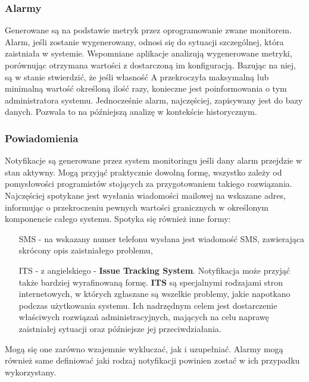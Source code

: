         \subsubsection{Alarmy}
        Generowane są na podstawie metryk przez oprogramowanie zwane monitorem. Alarm, jeśli zostanie wygenerowany, 
        odnosi się do sytuacji szczególnej, która zaistniała w systemie. Wspomniane aplikacje analizują wygenerowane metryki, 
        porównując otrzymana wartości z dostarczoną im konfiguracją. Bazując na niej, są w stanie stwierdzić, że jeśli
        własność A przekroczyła maksymalną lub minimalną wartość określoną ilość razy, konieczne jest poinformowania o tym
        administratora systemu. Jednocześnie alarm, najczęściej, zapisywany jest do bazy danych. Pozwala to na późniejszą analizę 
        w kontekście historycznym. 
        
        \subsubsection{Powiadomienia}
        Notyfikacje są generowane przez system monitoringu jeśli dany alarm przejdzie w stan aktywny. Mogą przyjąć praktycznie
        dowolną formę, wszystko zależy od pomysłowości programistów stojących za przygotowaniem takiego rozwiązania.
        Najczęściej spotykane jest wysłania wiadomości mailowej na wskazane adres, informując o 
        przekroczeniu pewnych wartości granicznych w określonym komponencie całego systemu. Spotyka się również inne formy:
        \begin{itemize}
            \item[SMS] - na wskazany numer telefonu wysłana jest wiadomość SMS, zawierająca skrócony opis zaistniałego problemu,
            \item[ITS] - z angielskiego - \textbf{Issue Tracking System}. Notyfikacja może przyjąć także bardziej wyrafinowaną formę.
            \textbf{ITS} są specjalnymi rodzajami stron internetowych, w których zgłaszane są wszelkie problemy, jakie napotkano
            podczas użytkowania systemu. Ich nadrzędnym celem jest dostarczenie właściwych rozwiązań administracyjnych, mających
            na celu naprawę zaistniałej sytuacji oraz późniejsze jej przeciwdziałania.
        \end{itemize}
        Mogą się one zarówno wzajemnie wykluczać, jak i uzupełniać. Alarmy mogą również same definiować jaki rodzaj notyfikacji
        powinien zostać w ich przypadku wykorzystany.
        

